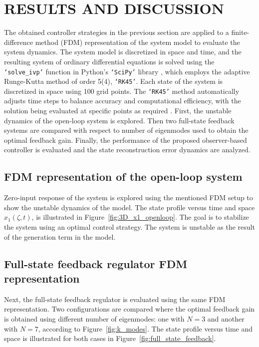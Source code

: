 \section{RESULTS AND DISCUSSION} \label{sec:results}

The obtained controller strategies in the previous section are applied to a finite-difference method (FDM) representation of the system model to evaluate the system dynamics. The system model is discretized in space and time, and the resulting system of ordinary differential equations is solved using the \texttt{`solve\_ivp'} function in Python's \texttt{`SciPy'} library \autocite{2020SciPy}, which employs the adaptive Runge-Kutta method of order 5(4), \texttt{`RK45'}. Each state of the system is discretized in space using 100 grid points. The \texttt{`RK45'} method automatically adjusts time steps to balance accuracy and computational efficiency, with the solution being evaluated at specific points as required \autocite{RK45_1,RK45_2}. First, the unstable dynamics of the open-loop system is explored. Then two full-state feedback systems are compared with respect to number of eigenmodes used to obtain the optimal feedback gain. Finally, the performance of the proposed observer-based controller is evaluated and the state reconstruction error dynamics are analyzed.

\subsection{FDM representation of the open-loop system}

Zero-input response of the system is explored using the mentioned FDM setup to show the unstable dynamics of the model. The state profile versus time and space $x_1(\zeta,t)$, is illustrated in Figure~\ref{fig:3D_x1_openloop}. The goal is to stabilize the system using an optimal control strategy. The system is unstable as the result of the generation term in the model.

\subsection{Full-state feedback regulator FDM representation}


Next, the full-state feedback regulator is evaluated using the same FDM representation. Two configurations are compared where the optimal feedback gain is obtained using different number of eigenmodes: one with $N=3$ and another with $N=7$, according to Figure~\ref{fig:k_modes}. The state profile versus time and space is illustrated for both cases in Figure~\ref{fig:full_state_feedback}. 


